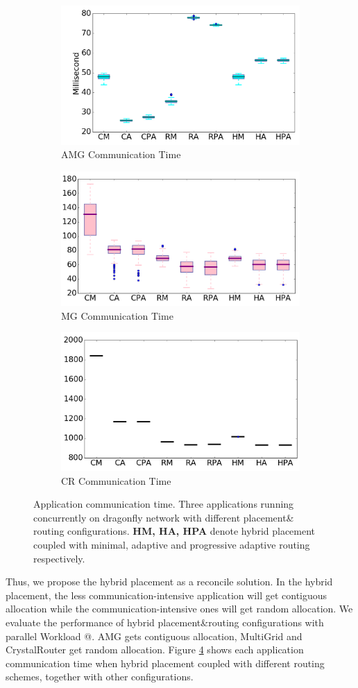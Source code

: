 \documentclass[conference,compsoc]{IEEEtran}
\makeatletter
\newcommand{\Rmnum}[1]{\expandafter\@slowromancap\romannumeral #1@}
\makeatother
\begin{document}
\begin{figure}[t!]
    \centering
    \begin{subfigure}[t]{0.32\textwidth}
        \centering
        \includegraphics[height=1.3 in]{hyb-plcmt/amg/commtime}
        \caption{AMG Communication Time}
        \label{fig:hyb-plcmt-amg-commtime}
    \end{subfigure}\hfill
    \hspace{1em}%
    \begin{subfigure}[t]{0.32\textwidth}
        \centering
        \includegraphics[height=1.3 in]{hyb-plcmt/mg/commtime}
        \caption{MG Communication Time}
        \label{fig:hyb-plcmt-mg-commtime}
    \end{subfigure}\hfill
    \begin{subfigure}[t]{0.32\textwidth}
        \centering
        \includegraphics[height=1.3 in]{hyb-plcmt/cr/commtime}
        \caption{CR Communication Time}
        \label{fig:hyb-plcmt-cr-commtime}
    \end{subfigure}%
   \caption{Application communication time. Three applications running concurrently on dragonfly network with different placement\& routing configurations. \textbf{HM, HA, HPA} denote hybrid placement coupled with minimal, adaptive and progressive adaptive routing respectively. }
   \label{fig:hyb-plcmt-apps-commtime}
\end{figure}

Thus, we propose the hybrid placement as a reconcile solution. In the hybrid placement, the less communication-intensive application will get contiguous allocation while the communication-intensive ones will get random allocation. We evaluate the performance of hybrid placement\&routing configurations with parallel Workload \Rmnum{1}. AMG gets contiguous allocation, MultiGrid and CrystalRouter get random allocation. Figure \ref{fig:hyb-plcmt-apps-commtime} shows each application communication time when hybrid placement coupled with different routing schemes, together with other configurations. 
\end{document}
